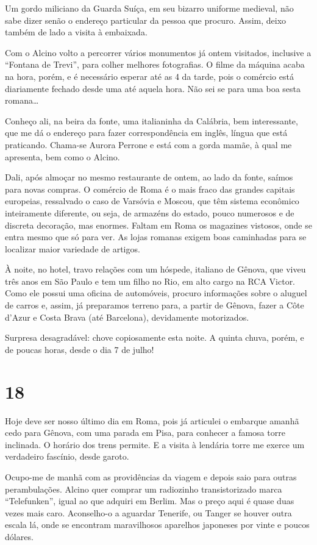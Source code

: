 Um gordo miliciano da Guarda Suíça, em seu bizarro uniforme medieval, não sabe dizer senão o endereço particular da pessoa que procuro. Assim, deixo também de lado a visita à embaixada.

Com o Alcino volto a percorrer vários monumentos já ontem visitados, inclusive a ``Fontana de Trevi'', para colher melhores fotografias. O filme da máquina acaba na hora, porém, e é necessário esperar até as 4 da tarde, pois o comércio está diariamente fechado desde uma até aquela hora. Não sei se para uma boa sesta romana\ldots

Conheço ali, na beira da fonte, uma italianinha da Calábria, bem interessante, que me dá o endereço para fazer correspondência em inglês, língua que está praticando. Chama-se Aurora Perrone e está com a gorda mamãe, à qual me apresenta, bem como o Alcino.

Dali, após almoçar no mesmo restaurante de ontem, ao lado da fonte, saímos para novas compras. O comércio de Roma é o mais fraco das grandes capitais europeias, ressalvado o caso de Varsóvia e Moscou, que têm sistema econômico inteiramente diferente, ou seja, de armazéns do estado, pouco numerosos e de discreta decoração, mas enormes. Faltam em Roma os magazines vistosos, onde se entra mesmo que só para ver. As lojas romanas exigem boas caminhadas para se localizar maior variedade de artigos.

À noite, no hotel, travo relações com um hóspede, italiano de Gênova, que viveu três anos em São Paulo e tem um filho no Rio, em alto cargo na RCA Victor. Como ele possui uma oficina de automóveis, procuro informações sobre o aluguel de carros e, assim, já preparamos terreno para, a partir de Gênova, fazer a Côte d’Azur e Costa Brava (até Barcelona), devidamente motorizados.

Surpresa desagradável: chove copiosamente esta noite. A quinta chuva, porém, e de poucas horas, desde o dia 7 de julho!

\section*{18 \adfflatleafright {}}
Hoje deve ser nosso último dia em Roma, pois já articulei o embarque amanhã cedo para Gênova, com uma parada em Pisa, para conhecer a famosa torre inclinada. O horário dos trens permite. E a visita à lendária torre me exerce um verdadeiro fascínio, desde garoto.

Ocupo-me de manhã com as providências da viagem e depois saio para outras perambulações. Alcino quer comprar um radiozinho transistorizado marca ``Telefunken'', igual ao que adquiri em Berlim. Mas o preço aqui é quase duas vezes mais caro. Aconselho-o a aguardar Tenerife, ou Tanger se houver outra escala lá, onde se encontram maravilhosos aparelhos japoneses por vinte e poucos dólares.

